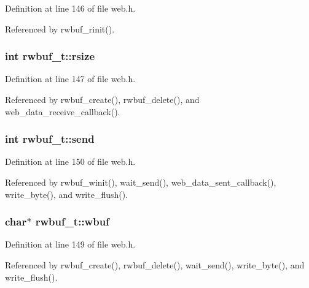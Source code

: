 Definition at line 146 of file web.\+h.



Referenced by rwbuf\+\_\+rinit().

\subsubsection[{\texorpdfstring{rsize}{rsize}}]{\setlength{\rightskip}{0pt plus 5cm}int rwbuf\+\_\+t\+::rsize}\hypertarget{structrwbuf__t_aa4094c7e329ae85cc50dbd06d3b50d44}{}\label{structrwbuf__t_aa4094c7e329ae85cc50dbd06d3b50d44}


Definition at line 147 of file web.\+h.



Referenced by rwbuf\+\_\+create(), rwbuf\+\_\+delete(), and web\+\_\+data\+\_\+receive\+\_\+callback().

\subsubsection[{\texorpdfstring{send}{send}}]{\setlength{\rightskip}{0pt plus 5cm}int rwbuf\+\_\+t\+::send}\hypertarget{structrwbuf__t_a279490994b6576ad00900254a8c07a89}{}\label{structrwbuf__t_a279490994b6576ad00900254a8c07a89}


Definition at line 150 of file web.\+h.



Referenced by rwbuf\+\_\+winit(), wait\+\_\+send(), web\+\_\+data\+\_\+sent\+\_\+callback(), write\+\_\+byte(), and write\+\_\+flush().

\subsubsection[{\texorpdfstring{wbuf}{wbuf}}]{\setlength{\rightskip}{0pt plus 5cm}char$\ast$ rwbuf\+\_\+t\+::wbuf}\hypertarget{structrwbuf__t_a68386231f3d907ec4508c090925782a2}{}\label{structrwbuf__t_a68386231f3d907ec4508c090925782a2}


Definition at line 149 of file web.\+h.



Referenced by rwbuf\+\_\+create(), rwbuf\+\_\+delete(), wait\+\_\+send(), write\+\_\+byte(), and write\+\_\+flush().

